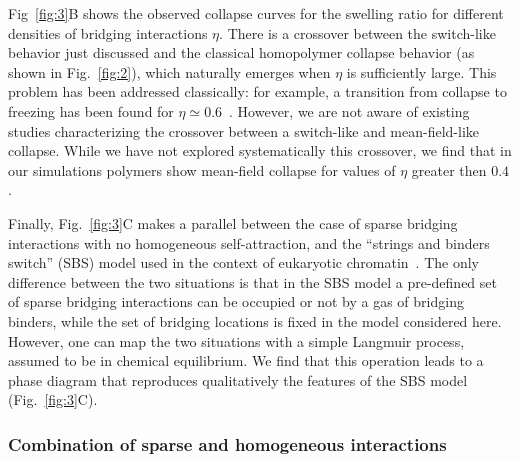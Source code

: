 \documentclass[
preprint,
a4paper,
12pt,
superscriptaddress,
pre]{revtex4}
\begin{document}
%
Fig~\ref{fig:3}B shows the observed collapse curves for the swelling
ratio for different densities of bridging interactions $\eta$. There
is a crossover between the switch-like behavior just discussed and the
classical homopolymer collapse behavior (as shown in
Fig.~\ref{fig:2}), which naturally emerges when $\eta$ is sufficiently
large. This problem has been addressed classically: for example, a
transition from collapse to freezing has been found for $\eta \simeq
0.6$~\cite{Camacho1997}. However, we are not aware of existing studies
characterizing the crossover between a switch-like and mean-field-like
collapse. While we have not explored systematically this crossover, we
find that in our simulations polymers show mean-field collapse for
values of $\eta$ greater then $0.4$.
%
%



Finally, Fig.~\ref{fig:3}C makes a parallel between the case of
sparse bridging interactions with no homogeneous self-attraction, and
the ``strings and binders switch'' (SBS) model used in the context of
eukaryotic chromatin~\cite{Barbieri2012,Barbieri2013b}.
The only difference between the two situations is that in the SBS
model a pre-defined set of sparse bridging interactions can be
occupied or not by a gas of bridging binders, while the set of
bridging locations is fixed in the model considered here. However, one
can map the two situations with a simple Langmuir process, assumed to
be in chemical equilibrium. We find that this operation leads to a
phase diagram that reproduces qualitatively the features of the SBS
model (Fig.~\ref{fig:3}C).



\subsubsection*{Combination of sparse and homogeneous interactions} 
\end{document}
